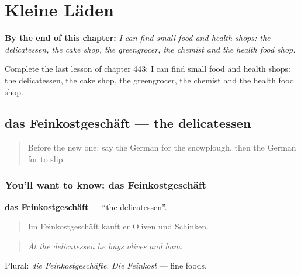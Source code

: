 
\chapter{Kleine Läden}
\label{ch:ge-kleine-laden}

\begin{chapteropening}
\textbf{By the end of this chapter:} \emph{I can find small food and health shops: the delicatessen, the cake shop, the greengrocer, the chemist and the health food shop.}

Complete the last lesson of chapter 443: I can find small food and health shops: the delicatessen, the cake shop, the greengrocer, the chemist and the health food shop.
\end{chapteropening}

\section[das Feinkostgeschäft]{das Feinkostgeschäft — the delicatessen}

\label{lesson:GE-C443-feinkostgeschaeft}



\begin{quote}
Before the new one: say the German for the snowplough, then the German for to slip.
\end{quote}

\subsection*{You'll want to know: das Feinkostgeschäft}
\textbf{das Feinkostgeschäft} — \textquotedblleft{}the delicatessen\textquotedblright{}.

\begin{quote}
Im Feinkostgeschäft kauft er Oliven und Schinken.
\end{quote}

\begin{quote}
\emph{At the delicatessen he buys olives and ham.}
\end{quote}

Plural: \emph{die Feinkostgeschäfte}. \emph{Die Feinkost} — fine foods.

